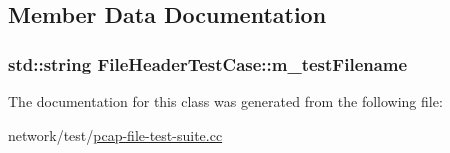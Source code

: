 \subsection{Member Data Documentation}
\subsubsection[{\texorpdfstring{m\+\_\+test\+Filename}{m_testFilename}}]{\setlength{\rightskip}{0pt plus 5cm}std\+::string File\+Header\+Test\+Case\+::m\+\_\+test\+Filename\hspace{0.3cm}{\ttfamily [private]}}\hypertarget{classFileHeaderTestCase_a4ab3078ae75680fcc90a3eca9f273cd2}{}\label{classFileHeaderTestCase_a4ab3078ae75680fcc90a3eca9f273cd2}


The documentation for this class was generated from the following file\+:\begin{DoxyCompactItemize}
\item 
network/test/\hyperlink{pcap-file-test-suite_8cc}{pcap-\/file-\/test-\/suite.\+cc}\end{DoxyCompactItemize}
